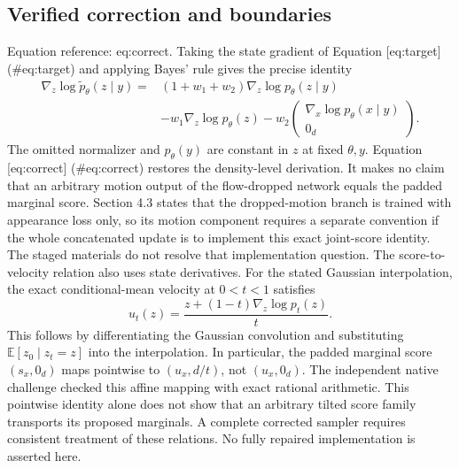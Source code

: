 \documentclass[10pt]{article}
\begin{document}
\subsection*{Verified correction and boundaries}
Equation reference: eq:correct. Taking the state gradient of Equation [eq:target] (\#eq:target) and applying Bayes’ rule gives the precise identity \[
\begin{split}
\nabla_z\log\widetilde p_\theta(z\mid y)
={}&(1+w_1+w_2)\nabla_z\log p_\theta(z\mid y)\\
&-w_1\nabla_z\log p_\theta(z)
-w_2\begin{pmatrix}\nabla_x\log p_\theta(x\mid y)\\0_d\end{pmatrix}.
\end{split}\] The omitted normalizer and \(p_\theta(y)\) are constant in \(z\) at fixed \(\theta,y\). Equation [eq:correct] (\#eq:correct) restores the density-level derivation. It makes no claim that an arbitrary motion output of the flow-dropped network equals the padded marginal score. Section 4.3 states that the dropped-motion branch is trained with appearance loss only, so its motion component requires a separate convention if the whole concatenated update is to implement this exact joint-score identity. The staged materials do not resolve that implementation question. The score-to-velocity relation also uses state derivatives. For the stated Gaussian interpolation, the exact conditional-mean velocity at \(0<t<1\) satisfies \[u_t(z)=\frac{z+(1-t)\nabla_z\log p_t(z)}{t}.\] This follows by differentiating the Gaussian convolution and substituting \(\mathbb E[z_0\mid z_t=z]\) into the interpolation. In particular, the padded marginal score \((s_x,0_d)\) maps pointwise to \((u_x,d/t)\), not \((u_x,0_d)\). The independent native challenge checked this affine mapping with exact rational arithmetic. This pointwise identity alone does not show that an arbitrary tilted score family transports its proposed marginals. A complete corrected sampler requires consistent treatment of these relations. No fully repaired implementation is asserted here.\par
\end{document}
